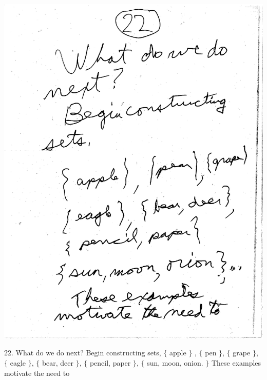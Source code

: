 \documentclass[10pt,a4paper]{article}
\begin{document}
\includegraphics[scale=.5]{Pages/Page_22}

22. What do we do next? Begin constructing sets, $\{$ apple $\}$ , $\{$ pen $\}$, $\{$ grape $\}$, $\{$ eagle $\}$, $\{$ bear, deer $\}$, $\{$ pencil, paper $\}$, $\{$ sun, moon, onion. $\}$ These examples motivate the need to

\vspace{.20 in}
\end{document}

